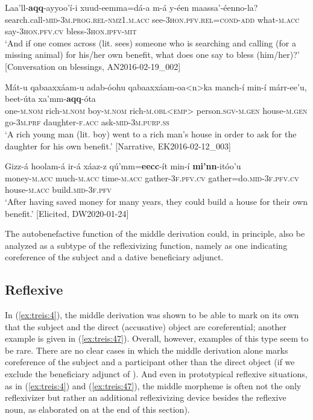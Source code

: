 \documentclass[output=paper]{langscibook}
\begin{document}
\ea \label{ex:treis:44} 
\gll Laa’ll-\textbf{aqq}-ayyoo’í-i xuud-eemma=dá-a m-á y-éen maassa’-éenno-la?\\
     search.call\textsc{-mid-3m.prog.rel-nmz1.m.acc} see-\textsc{3hon.pfv.rel=cond-add} what-\textsc{m.acc} say-\textsc{3hon.pfv.cv} bless-\textsc{3hon.ipfv-mit}\\
\glt ‘And if one comes across (lit. sees) someone who is searching and calling (for a missing animal) for his/her own benefit, what does one say to bless (him/her)?’ [Conversation on blessings, AN2016-02-19\_002]\z

\ea\label{ex:treis:45} 
\gll Mát-u qabaaxxáam-u adab-óohu qabaaxxáam-oa<n>ka manch-í min-í márr-ee’u, beet-úta xa’mm-\textbf{aqq}-óta\\
     one-\textsc{m.nom} rich-\textsc{m.nom} boy-\textsc{m.nom} rich-\textsc{m.obl<emp>} person.\textsc{sgv-m.gen} house-\textsc{m.gen} go-\textsc{3m.prf} daughter-\textsc{f.acc} ask-\textsc{mid-}3\textsc{m.purp.ss}\\
\glt ‘A rich young man (lit. boy) went to a rich man’s house in order to ask for the daughter for his own benefit.’ [Narrative, EK2016-02-12\_003]\z

\ea\label{ex:treis:46} 
\gll Gizz-á hoolam-á ir-á xáaz-z qú’mm=\textbf{eecc}-ít min-í \textbf{mi’nn}-itóo’u\\
     money-\textsc{m.acc} much-\textsc{m.acc} time-\textsc{m.acc} gather-\textsc{3f.pfv.cv} gather=do.\textsc{mid}\textsc{-3f.pfv.cv} house-\textsc{m.acc} build.\textsc{mid}-\textsc{3f.pfv}\\
\glt ‘After having saved money for many years, they could build a house for their own benefit.’ [Elicited, DW2020-01-24]\z

The autobenefactive function of the middle derivation could, in principle, also be analyzed as a subtype of the reflexivizing function, namely as one indicating coreference of the subject and a dative beneficiary adjunct.
     
\subsection{Reflexive}\label{sec:treis:4.2}

In (\ref{ex:treis:4}), the middle derivation was shown to be able to mark on its own that the subject and the direct (accusative) object are coreferential; another example is given in (\ref{ex:treis:47}). Overall, however, examples of this type seem to be rare. There are no clear cases in which the middle derivation alone marks coreference of the subject and a participant other than the direct object (if we exclude the beneficiary adjunct of ). And even in prototypical reflexive situations, as in (\ref{ex:treis:4}) and (\ref{ex:treis:47}), the middle morpheme is often not the only reflexivizer but rather an additional reflexivizing device besides the reflexive noun, as elaborated on at the end of this section).
\end{document}
